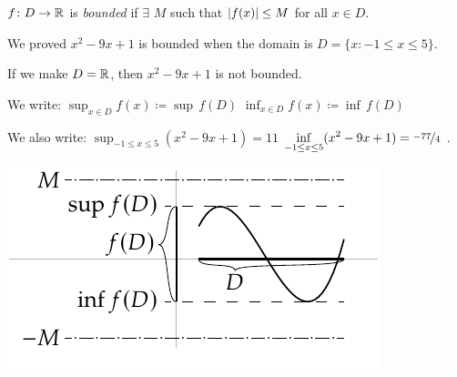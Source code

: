 \documentclass[10pt,aspectratio=149]{beamer}
\begin{document}
\begin{frame}

\begin{definition}
$f \colon D \to {\mathbb{R}}$ is
\emph{bounded}
if $\exists$ $M$
such that $\left\lvert {f(x)} \right\rvert \leq M$ for all $x \in D$.
\end{definition}

\pause

We proved $x^2-9x+1$ is bounded when the domain is $D = \{ x : -1 \leq x \leq 5 \}$.


\medskip
\pause

If we make $D={\mathbb{R}}$, then $x^2-9x+1$ is not bounded.

\medskip
\pause

We write: \quad 
$\displaystyle \sup_{x \in D} f(x) \coloneqq \sup\, f(D)$
\quad
$\displaystyle \inf_{x \in D} f(x) \coloneqq \inf\, f(D)$

\medskip
\pause

We also write: \quad 
$\displaystyle
\sup_{-1 \leq x \leq 5} ( x^2 -9x+1 ) = 11$
\quad
$\displaystyle\inf_{-1 \leq x \leq 5} ( x^2 -9x+1 ) = \nicefrac{-77}{4}$ .

\medskip
\pause

\hspace{1in}\includegraphics{../figures/boundedfunc}

\end{frame}
\end{document}
